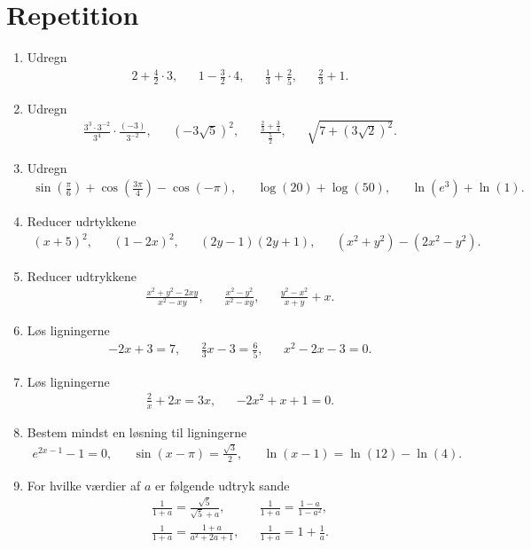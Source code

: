 \section{Repetition}
\begin{enumerate}
	\item Udregn
	\begin{align*}
	2+\frac{4}{2}\cdot 3,&& 1-\frac{3}{2}\cdot 4,&& \frac{1}{3}+\frac{2}{5},&& \frac{2}{3}+1.
	\end{align*}
	
	\item Udregn
	\begin{align*}
	\frac{3^3\cdot 3^{-2}}{3^4}\cdot \frac{(-3)}{3^{-2}},&& (-3\sqrt{5})^2,&&\frac{\frac{2}{3}+\frac{3}{4}}{\frac{5}{2}},&& \sqrt{7+(3\sqrt{2})^2}.
	\end{align*}
	
	\item Udregn
	\begin{align*}
	\sin(\frac{\pi}{6})+\cos(\frac{3\pi}{4})-\cos(-\pi),&& \log(20)+\log(50),&& \ln(e^3)+\ln(1).
	\end{align*}
	
	\item Reducer udrtykkene
	\begin{align*}
	(x+5)^2,&& (1-2x)^2,&& (2y-1)(2y+1),&& (x^2+y^2)-(2x^2-y^2).
	\end{align*}
	
	\item Reducer udtrykkene
	\begin{align*}
	\frac{x^2+y^2-2xy}{x^2-xy},&& \frac{x^2-y^2}{x^2-xy},&& \frac{y^2-x^2}{x+y}+x.
	\end{align*}
	
	\item Løs ligningerne
	\begin{align*}
	-2x+3=7,&& \frac{2}{3}x-3=\frac{6}{5},&&x^2-2x-3=0.
	\end{align*}
	
	\item Løs ligningerne
	\begin{align*}
	\frac{2}{x}+2x=3x,&& -2x^2+x+1=0.
	\end{align*}
	
	\item Bestem mindst en løsning til ligningerne
	\begin{align*}
	e^{2x-1}-1=0,&& \sin(x-\pi)=\frac{\sqrt{3}}{2},&& \ln(x-1)=\ln(12)-\ln(4).
	\end{align*}
	
	\item For hvilke værdier af $a$ er følgende udtryk sande
	\begin{align*}
	\frac{1}{1+a}=\frac{\sqrt{5}}{\sqrt{5}+a},&& \frac{1}{1+a}=\frac{1-a}{1-a^2},\\
	\frac{1}{1+a}=\frac{1+a}{a^2+2a+1},&& \frac{1}{1+a}=1+\frac{1}{a}.
	\end{align*}
	

\end{enumerate}
